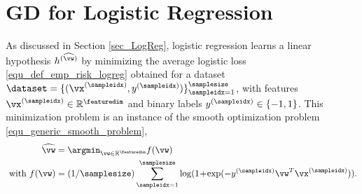 \documentclass[12pt]{report}
\begin{document}
\section{GD for Logistic Regression}
\label{sec_GD_logistic_regression}

As discussed in Section \ref{sec_LogReg}, logistic regression learns 
a linear hypothesis $h^{(\widehat{\vw})}$ by minimizing the average 
logistic loss \eqref{equ_def_emp_risk_logreg} obtained for a dataset $\dataset= \{ (\vx^{(\sampleidx)}, y^{(\sampleidx)}) \}_{\sampleidx=1}^{\samplesize}$, with features $\vx^{(\sampleidx)} \in \mathbb{R}^{\featuredim}$ and binary labels 
$y^{(\sampleidx)} \in \{-1,1\}$. This minimization problem is an instance 
of the smooth optimization problem \eqref{equ_generic_smooth_problem},
\begin{align} 
\label{equ_smooth_problem_logeg}
\widehat{\vw} & = \argmin_{\vw \in \mathbb{R}^{\featuredim}} f(\vw) \nonumber \\ 
 \mbox{ with } f(\vw) & = (1/\samplesize) \sum_{\sampleidx=1}^{\samplesize} \log( 1\!+\!\exp ( - y^{(\sampleidx)} \vw^{T} \vx^{(\sampleidx)})). 
\end{align} 
\end{document}
